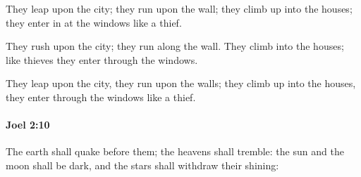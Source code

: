 			\begin{versebox}
					\item[BHS] 
					\item[LXX] 
					\item[ASV] They leap upon the city; they run upon the wall; they climb up into the houses; they enter in at the windows like a thief.
					\item[NIV] They rush upon the city; they run along the wall. They climb into the houses; like thieves they enter through the windows.
					\item[NRSV] They leap upon the city, they run upon the walls; they climb up into the houses, they enter through the windows like a thief.
			\end{versebox}

		\paragraph{Joel 2:10} %
			\label{JOEL-2-10}

			The earth shall quake before them; the heavens shall tremble: the sun and the moon shall be dark, and the stars shall withdraw their shining:

